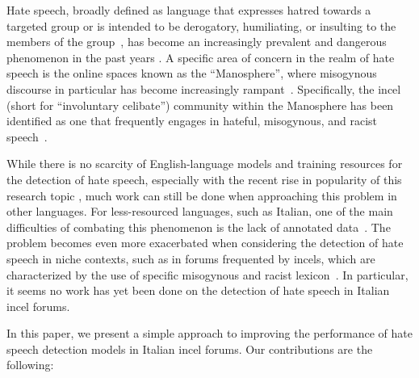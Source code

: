 \documentclass[11pt]{article}
\begin{document}
Hate speech, broadly defined as language that expresses hatred towards a targeted group or is intended to be derogatory, humiliating, or insulting to the members of the group~\cite{davidson-2017-automated-hate}, has become an increasingly prevalent and dangerous phenomenon in the past years \cite{matamoros-fernandezRacismHateSpeech2021}.
 A specific area of concern in the realm of hate speech is the online spaces known as the ``Manosphere'', where misogynous discourse in particular has become increasingly rampant~\cite{ribeiro2021evolution-manosphere}.
Specifically, the incel (short for ``involuntary celibate'') community within the Manosphere has been identified as one that frequently engages in hateful, misogynous, and racist speech~\cite{nagle-2017-kill-normies,jakiOnlineHatredWomen2019}.

While there is no scarcity of English-language models and training resources for 
the detection of hate speech, especially with the recent rise in popularity of 
this research topic \cite{alkomahLiteratureReviewTextual2022}, 
much work can still be done when approaching this problem in other languages.
For less-resourced languages, such as Italian, one of the main difficulties of combating this phenomenon is the lack of annotated data~\cite{van2023mitigating}. The problem becomes even more 
exacerbated when considering the detection of hate speech in niche contexts, 
such as in forums frequented by incels, which are characterized by the use of 
specific misogynous and racist lexicon~\cite{gothard2020ExploringIncelLanguage}. In particular, it seems no work has yet been done on the detection of hate speech in Italian incel forums.

In this paper, we present a simple approach to improving the performance of hate speech detection models in Italian incel forums. Our contributions are the following:
\end{document}
